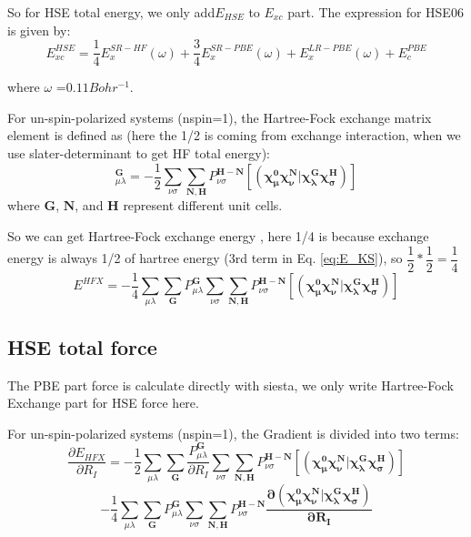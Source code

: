 \documentclass[aps,preprint,12pt]{revtex4-1}
\begin{document}
So for HSE total energy, we only add$ E_{HSE}$ to $E_{xc}$ part. 
The expression for HSE06 is given by: 
\begin{equation}
 E_{xc}^{HSE}=\dfrac{1}{4}E_{x}^{SR-HF}(\omega)+\dfrac{3}{4}E_{x}^{SR-PBE}(\omega)
+E_{x}^{LR-PBE}(\omega)+E_{c}^{PBE}
\end{equation} 

where  $\omega$ =$0.11 Bohr^{-1}$.



For un-spin-polarized systems (nspin=1), the Hartree-Fock exchange matrix element is defined as (here the 1/2 is coming from exchange interaction, when we use slater-determinant to get HF total energy): 
\begin{equation}
  [V^{X}]_{\mu\lambda}^{\mathbf{G}}=-\frac{1}{2}\sum_{\nu\sigma}\sum_{\mathbf{N,H}}P_{\nu\sigma}^\mathbf{H-N}\mathbf{[(\chi_{\mu}^{0}\chi_{\nu}^{N}|\chi_{\lambda}^{G}\chi_{\sigma}^{H})]}
\end{equation}
where $\mathbf{G}$, $\mathbf{N}$, and $\mathbf{H}$ represent different unit cells.


So we can get  Hartree-Fock exchange energy , here 1/4 is because exchange energy is always 1/2 of hartree energy (3rd term in Eq. \ref{eq:E_KS}), so $\dfrac{1}{2}*\dfrac{1}{2}=\dfrac{1}{4} $
 \begin{equation}
  E^{HFX}=-\frac{1}{4}\sum_{\mu \lambda}\sum_{\mathbf{G}}{ P_{\mu\lambda}^{\mathbf{G}} }  \sum_{\nu\sigma}\sum_{\mathbf{N,H}}
 P_{\nu\sigma}^\mathbf{H-N}\mathbf{[(\chi_{\mu}^{0}\chi_{\nu}^{N}
  |\chi_{\lambda}^{G}\chi_{\sigma}^{H})]}
\end{equation}



\subsection{HSE total force}
The PBE part force is calculate directly with siesta, we only write Hartree-Fock Exchange part for HSE force here.


For un-spin-polarized systems (nspin=1), the Gradient is divided into two terms:
\begin{equation}
 \dfrac{\partial{E_{HFX}}}{\partial{R_{I}}}
=-\frac{1}{2}\sum_{\mu\lambda}\sum_{\mathbf{G}}\dfrac{P_{\mu\lambda}^{\mathbf{G}}}{\partial{R_{I}}}\sum_{\nu\sigma}\sum_{\mathbf{N,H}}P_{\nu\sigma}^\mathbf{H-N}\mathbf{[(\chi_{\mu}^{0}\chi_{\nu}^{N}|\chi_{\lambda}^{G}\chi_{\sigma}^{H})]}
\end{equation}
\[
 -\frac{1}{4}\sum_{\mu\lambda}\sum_{\mathbf{G}}P_{\mu\lambda}^{\mathbf{G}}\sum_{\nu\sigma}\sum_{\mathbf{N,H}}P_{\nu\sigma}^\mathbf{H-N}\mathbf{ \dfrac{\partial{(\chi_{\mu}^{0}\chi_{\nu}^{N}|\chi_{\lambda}^{G}\chi_{\sigma}^{H})}}{\partial{R_{I}}} }
\]
\end{document}
